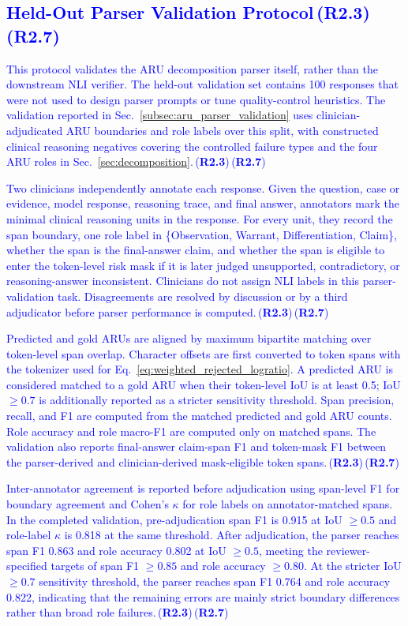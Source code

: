 \documentclass[a4paper,fleqn,doubleblind]{cas-sc}
\DeclareRobustCommand{\added}[1]{\textcolor{blue}{#1}}
\DeclareRobustCommand{\revtag}[1]{\textcolor{blue}{\scriptsize\,(\textbf{#1})}}
\begin{document}
\subsection{\added{Held-Out Parser Validation Protocol}\revtag{R2.3}\revtag{R2.7}}
\label{app:aru_parser_validation}

\added{This protocol validates the ARU decomposition parser itself, rather than the downstream NLI verifier. The held-out validation set contains 100 responses that were not used to design parser prompts or tune quality-control heuristics. The validation reported in Sec.~\ref{subsec:aru_parser_validation} uses clinician-adjudicated ARU boundaries and role labels over this split, with constructed clinical reasoning negatives covering the controlled failure types and the four ARU roles in Sec.~\ref{sec:decomposition}.}\revtag{R2.3}\revtag{R2.7}

\added{Two clinicians independently annotate each response. Given the question, case or evidence, model response, reasoning trace, and final answer, annotators mark the minimal clinical reasoning units in the response. For every unit, they record the span boundary, one role label in \{Observation, Warrant, Differentiation, Claim\}, whether the span is the final-answer claim, and whether the span is eligible to enter the token-level risk mask if it is later judged unsupported, contradictory, or reasoning-answer inconsistent. Clinicians do not assign NLI labels in this parser-validation task. Disagreements are resolved by discussion or by a third adjudicator before parser performance is computed.}\revtag{R2.3}\revtag{R2.7}

\added{Predicted and gold ARUs are aligned by maximum bipartite matching over token-level span overlap. Character offsets are first converted to token spans with the tokenizer used for Eq.~\ref{eq:weighted_rejected_logratio}. A predicted ARU is considered matched to a gold ARU when their token-level IoU is at least 0.5; IoU $\geq 0.7$ is additionally reported as a stricter sensitivity threshold. Span precision, recall, and F1 are computed from the matched predicted and gold ARU counts. Role accuracy and role macro-F1 are computed only on matched spans. The validation also reports final-answer claim-span F1 and token-mask F1 between the parser-derived and clinician-derived mask-eligible token spans.}\revtag{R2.3}\revtag{R2.7}

\added{Inter-annotator agreement is reported before adjudication using span-level F1 for boundary agreement and Cohen's $\kappa$ for role labels on annotator-matched spans. In the completed validation, pre-adjudication span F1 is 0.915 at IoU $\geq 0.5$ and role-label $\kappa$ is 0.818 at the same threshold. After adjudication, the parser reaches span F1 0.863 and role accuracy 0.802 at IoU $\geq 0.5$, meeting the reviewer-specified targets of span F1 $\geq 0.85$ and role accuracy $\geq 0.80$. At the stricter IoU $\geq 0.7$ sensitivity threshold, the parser reaches span F1 0.764 and role accuracy 0.822, indicating that the remaining errors are mainly strict boundary differences rather than broad role failures.}\revtag{R2.3}\revtag{R2.7}
\end{document}
